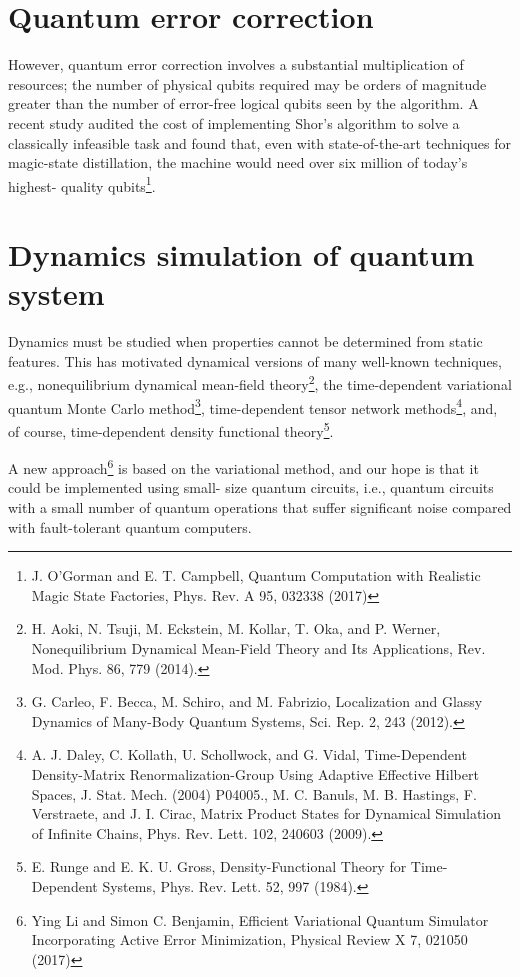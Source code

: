 \documentclass[11pt, oneside]{article}   	%
\begin{document}
\section{Quantum error correction}
However, quantum error correction involves a substantial multiplication of resources; the number of physical qubits required may be orders of magnitude greater than the number of error-free logical qubits seen by the algorithm. A recent study audited the cost of implementing Shor’s algorithm to solve a classically infeasible task and found that, even with state-of-the-art techniques for magic-state distillation, the machine would need over six million of today’s highest- quality qubits\footnote{J. O’Gorman and E. T. Campbell, Quantum Computation with Realistic Magic State Factories, Phys. Rev. A 95, 032338 (2017)}.

\section{Dynamics simulation of  quantum system}
Dynamics must be studied when properties cannot be determined from static features. 
This has motivated dynamical versions of many well-known techniques, e.g., nonequilibrium dynamical mean-field theory\footnote{H. Aoki, N. Tsuji, M. Eckstein, M. Kollar, T. Oka, and P. Werner, Nonequilibrium Dynamical Mean-Field Theory and Its Applications, Rev. Mod. Phys. 86, 779 (2014).}, 
the time-dependent variational quantum Monte Carlo method\footnote{G. Carleo, F. Becca, M. Schiro, and M. Fabrizio, Localization and Glassy Dynamics of Many-Body Quantum Systems, Sci. Rep. 2, 243 (2012).}, 
time-dependent tensor network methods\footnote{A. J. Daley, C. Kollath, U. Schollwock, and G. Vidal,
Time-Dependent Density-Matrix Renormalization-Group Using Adaptive Effective Hilbert Spaces, J. Stat. Mech. (2004) P04005., M. C. Banuls, M. B. Hastings, F. Verstraete, and J. I. Cirac, Matrix Product States for Dynamical Simulation of Infinite Chains, Phys. Rev. Lett. 102, 240603 (2009).}, 
and, of course, time-dependent density functional theory\footnote{E. Runge and E. K. U. Gross, Density-Functional Theory for
Time-Dependent Systems, Phys. Rev. Lett. 52, 997 (1984).}. 

A new approach\footnote{Ying Li and Simon C. Benjamin, Efficient Variational Quantum Simulator Incorporating Active Error Minimization, Physical Review X 7, 021050 (2017)} is based on the variational method, and our hope is that it could be implemented using small- size quantum circuits, i.e., quantum circuits with a small number of quantum operations that suffer significant noise compared with fault-tolerant quantum computers.
\end{document}
